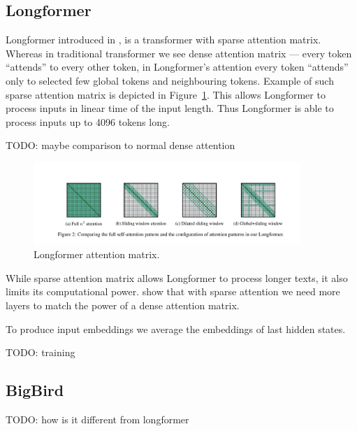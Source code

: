 \subsection{Longformer}

Longformer introduced in \cite{beltagy2020longformer}, is a transformer with
sparse attention matrix. Whereas in traditional transformer we see dense
attention matrix --- every token ``attends'' to every other token, in
Longformer's attention every token ``attends'' only to selected few global
tokens and neighbouring tokens. Example of such sparse attention matrix is
depicted in Figure~\ref{fig:longformer_sparse_att}. This allows Longformer to
process inputs in linear time of the input length. Thus Longformer is able to
process inputs up to 4096 tokens long.

TODO: maybe comparison to normal dense attention

\begin{figure}[h]
    \centering
    \includegraphics[width=0.9\textwidth]{./img/longformer_attention.png}
    \caption{Longformer attention matrix.\label{fig:longformer_sparse_att}}
\end{figure}

While sparse attention matrix allows Longformer to process longer texts, it also
limits its computational power. \cite{zaheer2020big} show that with sparse
attention we need more layers to match the power of a dense attention matrix.

To produce input embeddings we average the embeddings of last hidden states.

TODO: training

\subsection{BigBird}

TODO: how is it different from longformer
